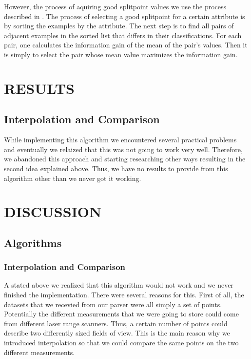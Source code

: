 \documentclass[a4paper, 10pt, conference]{ieeeconf}      %
\begin{document}
However, the process of aquiring good splitpoint values we use the process described in \cite{ml3}. The process of selecting a good splitpoint for a certain attribute is by sorting the examples by the attribute. The next step is to find all pairs of adjacent examples in the sorted list that differs in their classifications. For each pair, one calculates the information gain of the mean of the pair's values. Then it is simply to select the pair whose mean value maximizes the information gain.

\section{RESULTS}

\subsection{Interpolation and Comparison}
While implementing this algorithm we encountered several practical problems and eventually we relaized that this was not going to work very well. Therefore, we abandoned this approach and starting researching other ways resulting in the second idea explained above. Thus, we have no results to provide from this algorithm other than we never got it working.

\section{DISCUSSION}

\subsection{Algorithms}

\subsubsection{Interpolation and Comparison}
A stated above we realized that this algorithm would not work and we never finished the implementation. There were several reasons for this. First of all, the datasets that we recevied from our parser were all simply a set of points. Potentially the different measurements that we were going to store could come from different laser range scanners. Thus, a certain number of points could describe two differently sized fields of view. This is the main reason why we introduced interpolation so that we could compare the same points on the two different measurements.
\end{document}
